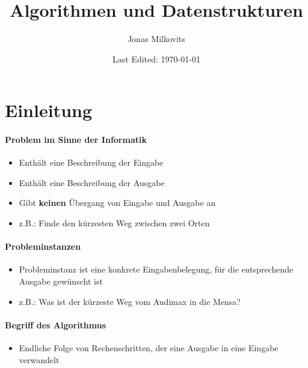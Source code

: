 

\begin{titlepage}
  \title{Algorithmen und Datenstrukturen} %
  \author{Jonas Milkovits}
  \date{Last Edited: \today}
\end{titlepage}



\maketitle
{} %
\tableofcontents
\clearpage
{} %


\section{Einleitung}

\paragraph{Problem im Sinne der Informatik}
	\begin{itemize}
      	\item Enthält eine Beschreibung der Eingabe 
      	\item Enthält eine Beschreibung der Ausgabe
      	\item Gibt \textbf{keinen} Übergang von Eingabe und Ausgabe an
      	\item z.B.: Finde den kürzesten Weg zwischen zwei Orten
	\end{itemize}
	
\paragraph{Probleminstanzen}
    \begin{itemize}
      	\item Probleminstanz ist eine konkrete Eingabenbelegung, für die entsprechende Ausgabe gewünscht ist
      	\item z.B.: Was ist der kürzeste Weg vom Audimax in die Mensa?
	\end{itemize}
	
\paragraph{Begriff des Algorithmus}
    \begin{itemize}
    	\item Endliche Folge von Rechenschritten, der eine Ausgabe in eine Eingabe verwandelt 
	\end{itemize}
	
